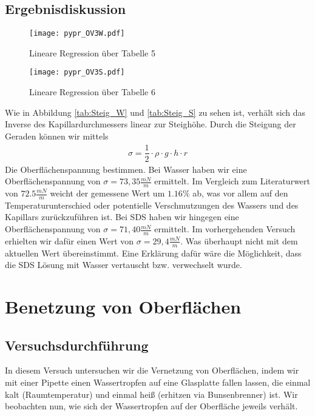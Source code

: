\documentclass{scrartcl}
\begin{document}
\subsection{Ergebnisdiskussion}
\begin{figure}[H]
  \centering
    \texttt{[image: pypr\_OV3W.pdf]}
  \caption{Lineare Regression über Tabelle 5}
  \label{fig:Steig_W}
\end{figure}
\begin{figure}[H]
  \centering
    \texttt{[image: pypr\_OV3S.pdf]}
  \caption{Lineare Regression über Tabelle 6}
  \label{fig:Steig_S}
\end{figure}
Wie in Abbildung \ref{tab:Steig_W} und \ref{tab:Steig_S} zu sehen ist, verhält sich das Inverse des Kapillardurchmessers linear zur Steighöhe. Durch die Steigung der Geraden können wir mittels
\begin{align}
\sigma = \dfrac{1}{2}\cdot \rho \cdot g \cdot h \cdot r 
\label{eq:sigma_V3}
\end{align}
Die Oberflächenspannung bestimmen.
Bei Wasser haben wir eine Oberflächenspannung von $\sigma = 73,35 \frac{mN}{m}$ ermittelt. Im Vergleich zum Literaturwert von $72.5 \frac{mN}{m}$ weicht der gemessene Wert um $1.16\%$ ab, was vor allem auf den Temperaturunterschied oder potentielle Verschmutzungen des Wassers und des Kapillars zurückzuführen ist.
Bei SDS haben wir hingegen eine Oberflächenspannung von $\sigma = 71,40 \frac{mN}{m}$ ermittelt. Im vorhergehenden Versuch erhielten wir dafür einen Wert von $\sigma = 29,4 \frac{mN}{m}$. Was überhaupt nicht mit dem aktuellen Wert übereinstimmt.
Eine Erklärung dafür wäre die Möglichkeit, dass die SDS Lösung mit Wasser vertauscht bzw. verwechselt wurde.

\newpage
\section{Benetzung von Oberflächen}
\subsection{Versuchsdurchführung}
In diesem Versuch untersuchen wir die Vernetzung von Oberflächen, indem wir mit einer Pipette einen Wassertropfen auf eine Glasplatte fallen lassen,  die einmal kalt (Raumtemperatur) und einmal heiß (erhitzen via Bunsenbrenner) ist.
Wir beobachten nun, wie sich der Wassertropfen auf der Oberfläche jeweils verhält. 
\end{document}
